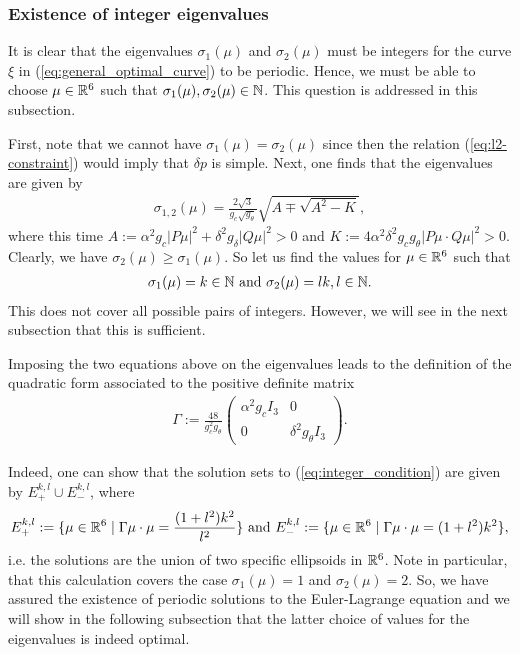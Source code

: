 \subsubsection{Existence of integer eigenvalues}
It is clear that the eigenvalues $\sigma_1(\mu)$ and $\sigma_2(\mu)$ must be integers for the curve $\xi$ in (\ref{eq:general_optimal_curve}) to be periodic. Hence, we must be able to choose $\mu \in \mathbb{R}^6$ such that $\sigma_1(\mu), \sigma_2(\mu) \in \mathbb{N}$. This question is addressed in this subsection.

First, note that we cannot have $\sigma_1(\mu) = \sigma_2(\mu)$ since then the relation (\ref{eq:l2-constraint}) would imply that $\delta p$ is simple. Next, one finds that the eigenvalues are given by
\begin{align}
	\sigma_{1,2}(\mu) = \frac{2 \sqrt{3}}{g_c \sqrt{g_\theta}} \sqrt{A \mp \sqrt{A^2 - K}},
\end{align}
where this time $A := \alpha^2 g_c |P \mu|^2 + \delta^2 g_{\delta} |Q \mu|^2 > 0$ and $K := 4 \alpha^2 \delta^2 g_c g_\theta |P\mu \cdot Q \mu|^2 > 0$. Clearly, we have $\sigma_2(\mu) \geq \sigma_1(\mu)$. So let us find the values for $\mu \in \mathbb{R}^6$ such that
\begin{align}
\label{eq:integer_condition}
	\sigma_1(\mu) = k \in \mathbb{N} \text{ and } \sigma_2(\mu) = lk, l \in \mathbb{N}.
\end{align}
This does not cover all possible pairs of integers. However, we will see in the next subsection that this is sufficient.

Imposing the two equations above on the eigenvalues leads to the definition of the quadratic form associated to the positive definite matrix
\begin{align}
	\Gamma := \frac{48}{g_c^2 g_\theta} \left (\begin{array}{cc}
	\alpha^2 g_c I_3 & 0 \\ 
	0 & \delta^2 g_\theta I_3
	\end{array}  \right ).
\end{align}

Indeed, one can show that the solution sets to (\ref{eq:integer_condition}) are given by $E_+^{k,l} \cup E_{-}^{k,l}$, where
\begin{align}
E_+^{k,l} := \{\mu \in \mathbb{R}^6 \mid \Gamma \mu \cdot \mu = \frac{(1 + l^2)k^2}{l^2}\} \text{ and } E_{-}^{k,l} := \{\mu \in \mathbb{R}^6 \mid \Gamma \mu \cdot \mu = (1 + l^2)k^2\},
\end{align}
i.e. the solutions are the union of two specific ellipsoids in $\mathbb{R}^6$. Note in particular, that this calculation covers the case $\sigma_1(\mu) = 1$ and $\sigma_2(\mu) = 2$. So, we have assured the existence of periodic solutions to the Euler-Lagrange equation and we will show in the following subsection that the latter choice of values for the eigenvalues is indeed optimal.

